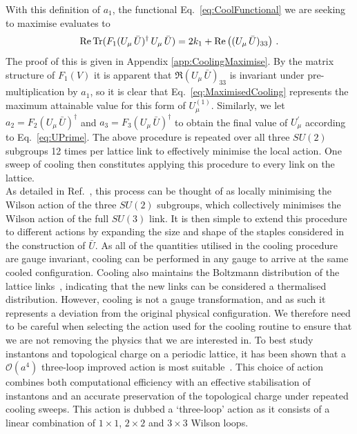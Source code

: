 With this definition of $a_1$, the functional Eq.~\ref{eq:CoolFunctional} we are seeking to maximise evaluates to
%
\begin{equation}
\operatorname{Re} \operatorname{Tr} (F_1(U_\mu\,\bar{U})^\dagger \, U_\mu \, \bar{U}) = 2k_1 + \operatorname{Re}\left( (U_\mu\, \bar{U})_{33}\right)\, .
\label{eq:MaximisedCooling}
\end{equation}
%
The proof of this is given in Appendix \ref{app:CoolingMaximise}. By the matrix structure of $F_1(V)$ it is apparent that $\Re(U_\mu\, \bar{U})_{33}$ is invariant under pre-multiplication by $a_1$, so it is clear that Eq.~\ref{eq:MaximisedCooling} represents the maximum attainable value for this form of $U^{(1)}_\mu$. Similarly, we let $a_2=F_2(U_\mu\,\bar{U})^\dagger$ and $a_3=F_3(U_\mu\,\bar{U})^\dagger$ to obtain the final value of $U^\prime_\mu$ according to Eq.~\ref{eq:UPrime}. The above procedure is repeated over all three $SU(2)$ subgroups 12 times per lattice link to effectively minimise the local action. One sweep of cooling then constitutes applying this procedure to every link on the lattice.\\

As detailed in Ref.~\cite{Bonnet:2000dc}, this process can be thought of as locally minimising the Wilson action of the three $SU(2)$ subgroups, which collectively minimises the Wilson action of the full $SU(3)$ link. It is then simple to extend this procedure to different actions by expanding the size and shape of the staples considered in the construction of $\bar{U}$. As all of the quantities utilised in the cooling procedure are gauge invariant, cooling can be performed in any gauge to arrive at the same cooled configuration. Cooling also maintains the Boltzmann distribution of the lattice links~\cite{Cabibbo:1982zn}, indicating that the new links can be considered a thermalised distribution. However, cooling is not a gauge transformation, and as such it represents a deviation from the original physical configuration. We therefore need to be careful when selecting the action used for the cooling routine to ensure that we are not removing the physics that we are interested in. To best study instantons and topological charge on a periodic lattice, it has been shown that a $\mathcal{O}(a^4)$ three-loop  improved action is most suitable~\cite{BilsonThompson:2002jk}. This choice of action combines both computational efficiency with an effective stabilisation of instantons and an accurate preservation of the topological charge under repeated cooling sweeps. This action is dubbed a `three-loop' action as it consists of a linear combination of $1\times 1$, $2\times 2$ and $3\times 3$ Wilson loops.


